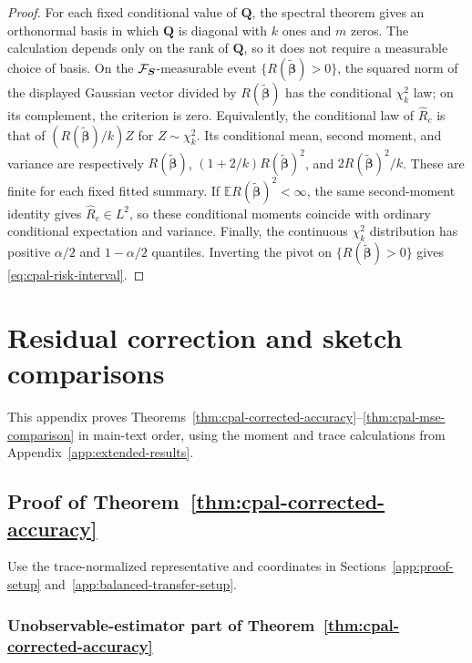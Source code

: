 \documentclass{article}
\theoremstyle{plain}
\theoremstyle{definition}
\theoremstyle{definition}
\def\E{{\mathbb{E}}}
\def\mathbold{\boldsymbol}
\def\bQ{\mathbold{Q}}\def\hbQ{{\widehat{\bQ}}}\def\tbQ{{\widetilde{\bQ}}}
\def\bS{\mathbold{S}}\def\hbS{{\widehat{\bS}}}\def\tbS{{\widetilde{\bS}}}
\def\bbeta{\mathbold{\beta}}\def\betahat{\widehat{\beta}}\def\hbeta{\widehat{\beta}}
\begin{document}
\begin{proof}
For each fixed conditional value of $\bQ$, the spectral theorem gives an
orthonormal basis in which $\bQ$ is diagonal with $k$ ones and $m$ zeros.
The calculation depends only on the rank of $\bQ$, so it does not require
a measurable choice of basis. On the $\calF_{\bS}$-measurable event
$\{R(\widetilde{\bbeta})>0\}$, the squared norm of the displayed
Gaussian vector divided by $R(\widetilde{\bbeta})$ has the conditional
$\chi^2_k$ law; on its complement, the criterion is zero. Equivalently,
the conditional law of $\widehat R_c$ is that of
$(R(\widetilde{\bbeta})/k)Z$ for $Z\sim\chi^2_k$. Its conditional mean,
second moment, and variance are respectively
$R(\widetilde{\bbeta})$,
$(1+2/k)R(\widetilde{\bbeta})^2$, and
$2R(\widetilde{\bbeta})^2/k$. These are finite for each fixed fitted
summary. If $\E R(\widetilde{\bbeta})^2<\infty$, the same second-moment
identity gives $\widehat R_c\in L^2$, so these conditional
moments coincide with ordinary conditional expectation and variance.
Finally, the continuous $\chi^2_k$ distribution has positive
$\alpha/2$ and $1-\alpha/2$ quantiles. Inverting the pivot on
$\{R(\widetilde{\bbeta})>0\}$ gives
\eqref{eq:cpal-risk-interval}.
\end{proof}

\clearpage
\section{Residual correction and sketch comparisons}
\label{app:setup-proofs}
\label{app:underparameterized-proofs}

This appendix proves
Theorems~\ref{thm:cpal-corrected-accuracy}--\ref{thm:cpal-mse-comparison}
in main-text order, using the moment and trace calculations from
Appendix~\ref{app:extended-results}.

\subsection{Proof of Theorem~\ref{thm:cpal-corrected-accuracy}}

Use the trace-normalized representative and coordinates in
Sections~\ref{app:proof-setup} and~\ref{app:balanced-transfer-setup}.

\subsubsection{Unobservable-estimator part of Theorem~\ref{thm:cpal-corrected-accuracy}}
\label{app:proof-R-sens-general}
\end{document}
